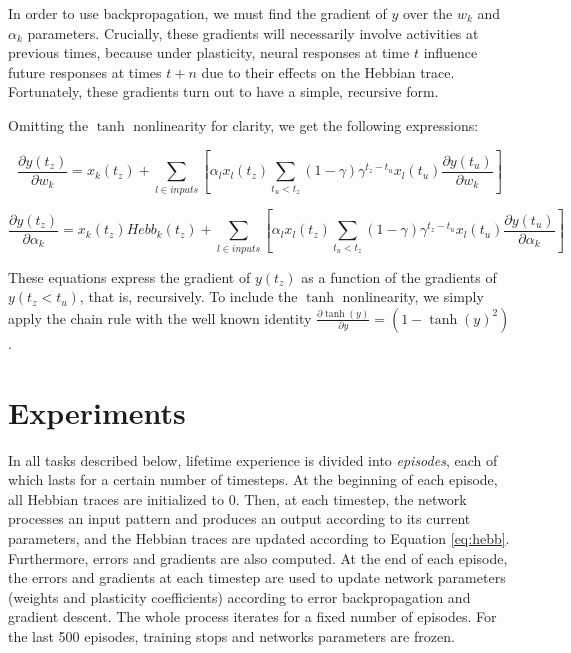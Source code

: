 \documentclass{article}
\begin{document}
In order to use backpropagation, we must find the gradient of $y$ over the $w_k$ and
$\alpha_k$ parameters. Crucially, these gradients will necessarily
involve activities at previous times, because under plasticity, neural responses at time $t$ influence future responses at times $t+n$ due to their effects on the Hebbian trace. 
Fortunately, these gradients turn out to
have a simple, recursive form. 

Omitting the $\tanh$ nonlinearity for clarity, we get the
following expressions: 

\begin{equation}
\label{eq:gradw}
\frac{\partial y(t_z)}{\partial w_k} = x_k(t_z) + \sum_{l \in inputs}[\alpha_l
x_l(t_z) \sum_{t_u<t_z}(1-\gamma) \gamma^{t_z-t_u} x_l(t_u) \frac{\partial
y(t_u)}{\partial w_k}]
\end{equation}

\begin{equation}
\label{eq:gradalpha}
\frac{\partial y(t_z)}{\partial \alpha_k} = x_k(t_z) Hebb_k(t_z) + \sum_{l \in inputs}
[\alpha_l x_l(t_z) \sum_{t_u<t_z}(1-\gamma) \gamma^{t_z-t_u} x_l(t_u) \frac{\partial
y(t_u)}{\partial \alpha_k}]
\end{equation}

These equations express the gradient of $y(t_z)$ as a function of the gradients
of $y(t_z<t_u)$, that is, recursively. To include the $\tanh$ nonlinearity, we
simply apply the chain rule with the well known identity $\frac{\partial \tanh(y)}{\partial y} = (1
- \tanh(y)^2)$.


\section{Experiments}


In all tasks described below, lifetime experience is divided into
\emph{episodes}, each of which lasts for a certain number of timesteps. At the
beginning of each episode, all Hebbian traces are initialized to 0. Then,
at each timestep, the network processes an input pattern and produces an output
according to its current parameters, and the Hebbian traces are updated
according to Equation \ref{eq:hebb}. Furthermore, errors and gradients are also
computed. At the end of each episode, the errors and gradients at each timestep
are used to update network parameters (weights and plasticity coefficients)
according to error backpropagation and gradient descent. The whole process
iterates for a fixed number of episodes. For the last 500 episodes, training
stops and networks parameters are frozen.
\end{document}
